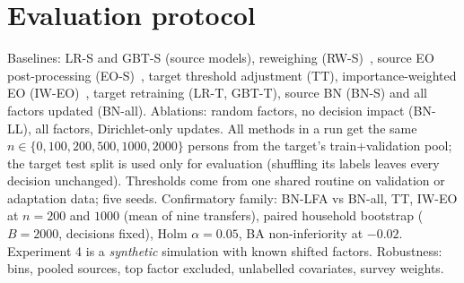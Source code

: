 \documentclass[11pt,a4paper]{article}
\begin{document}
\section{Evaluation protocol}
Baselines: LR-S and GBT-S (source models), reweighing (RW-S)~\cite{kamiran}, source EO post-processing
(EO-S)~\cite{hardt}, target threshold adjustment (TT), importance-weighted EO (IW-EO)~\cite{shimodaira}, target retraining (LR-T, GBT-T), source BN (BN-S) and all factors
updated (BN-all). Ablations: random factors, no decision impact (BN-LL), all factors, Dirichlet-only updates. All methods
in a run get the same $n\in\{0,100,200,500,1000,2000\}$ persons from the target's train+validation pool; the target
test split is used only for evaluation (shuffling its labels leaves every decision unchanged). Thresholds come from one
shared routine on validation or adaptation data; five seeds. Confirmatory family: BN-LFA vs BN-all, TT, IW-EO at
$n=200$ and $1000$ (mean of nine transfers), paired household bootstrap ($B=2000$, decisions fixed), Holm $\alpha=0.05$,
BA non-inferiority at $-0.02$. Experiment 4 is a \emph{synthetic} simulation with known shifted factors. Robustness:
bins, pooled sources, top factor excluded, unlabelled covariates, survey weights.
\end{document}
